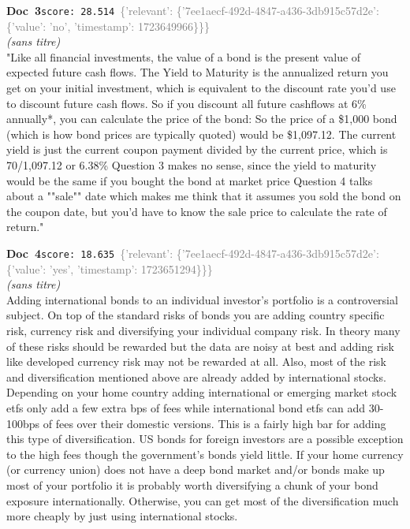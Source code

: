 \documentclass[a4paper,11pt]{article}
\begin{document}
\begin{docenv}
{\footnotesize\textcolor{doccolor}{\textbf{Doc~3}}}\hfill{\tiny\texttt{score:~28.514}}\ {\tiny\textcolor{gray}{\{'relevant': \{'7ee1aecf-492d-4847-a436-3db915c57d2e': \{'value': 'no', 'timestamp': 1723649966\}\}\}}}\\[3pt]
{\small\textit{(sans titre)}}\\[2pt]
\vspace{2pt}
{\footnotesize 
"Like all financial investments, the value of a bond is the present value of expected future cash flows.  The Yield to Maturity is the annualized return you get on your initial investment, which is equivalent to the discount rate you'd use to discount future cash flows. So if you discount all future cashflows at 6\% annually*, you can calculate the price of the bond: So the price of a \$1,000 bond (which is how bond prices are typically quoted) would be \$1,097.12. The current yield is just the current coupon payment divided by the current price, which is 70/1,097.12 or 6.38\% Question 3 makes no sense, since the yield to maturity would be the same if you bought the bond at market price Question 4 talks about a ""sale"" date which makes me think that it assumes you sold the bond on the coupon date, but you'd have to know the sale price to calculate the rate of return."}
\end{docenv}
\begin{docenv}
{\footnotesize\textcolor{doccolor}{\textbf{Doc~4}}}\hfill{\tiny\texttt{score:~18.635}}\ {\tiny\textcolor{gray}{\{'relevant': \{'7ee1aecf-492d-4847-a436-3db915c57d2e': \{'value': 'yes', 'timestamp': 1723651294\}\}\}}}\\[3pt]
{\small\textit{(sans titre)}}\\[2pt]
\vspace{2pt}
{\footnotesize 
Adding international bonds to an individual investor's portfolio is a controversial subject.  On top of the standard risks of bonds you are adding country specific risk, currency risk and diversifying your individual company risk.  In theory many of these risks should be rewarded but the data are noisy at best and adding risk like developed currency risk may not be rewarded at all. Also, most of the risk and diversification mentioned above are already added by international stocks.  Depending on your home country adding international or emerging market stock etfs only add a few extra bps of fees while international bond etfs can add 30-100bps of fees over their domestic versions.  This is a fairly high bar for adding this type of diversification.  US bonds for foreign investors are a possible exception to the high fees though the government's bonds yield little. If your home currency (or currency union) does not have a deep bond market and/or bonds make up most of your portfolio it is probably worth diversifying a chunk of your bond exposure internationally.  Otherwise, you can get most of the diversification much more cheaply by just using international stocks.}
\end{docenv}
\end{document}

